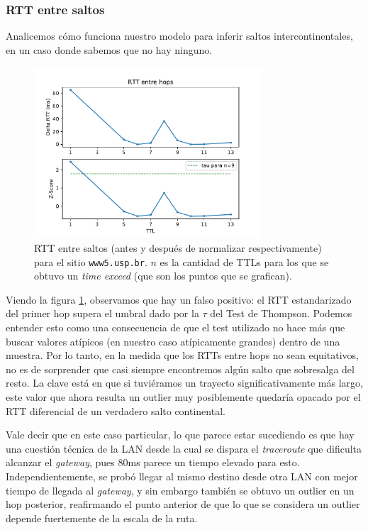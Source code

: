 \subsubsection*{RTT entre saltos}

Analicemos cómo funciona nuestro modelo para inferir saltos intercontinentales, en un caso donde sabemos que no hay ninguno.

\begin{figure}[H]
  \centering
  \includegraphics[width=8.5cm]{figs/traceroute-saopaulo.pdf}
  \caption{\footnotesize RTT entre saltos (antes y después de normalizar respectivamente) para el sitio \texttt{www5.usp.br}. $n$ es la cantidad de TTLs para los que se obtuvo un \emph{time exceed} (que son los puntos que se grafican).}
  \label{plot-saopaulo}
\end{figure}

Viendo la figura \ref{plot-saopaulo}, observamos que hay un falso positivo: el RTT estandarizado del primer hop supera el umbral dado por la $\tau$ del Test de Thompson. Podemos entender esto como una consecuencia de que el test utilizado no hace más que buscar valores atípicos (en nuestro caso atípicamente grandes) dentro de una muestra. Por lo tanto, en la medida que los RTTs entre hops no sean equitativos, no es de sorprender que casi siempre encontremos algún salto que sobresalga del resto. La clave está en que si tuviéramos un trayecto significativamente más largo, este valor que ahora resulta un outlier muy posiblemente quedaría opacado por el RTT diferencial de un verdadero salto continental.

Vale decir que en este caso particular, lo que parece estar sucediendo es que hay una cuestión técnica de la LAN desde la cual se dispara el \emph{traceroute} que dificulta alcanzar el \emph{gateway}, pues 80ms parece un tiempo elevado para esto. Independientemente, se probó llegar al mismo destino desde otra LAN con mejor tiempo de llegada al \emph{gateway}, y sin embargo también se obtuvo un outlier en un hop posterior, reafirmando el punto anterior de que lo que se considera un outlier depende fuertemente de la escala de la ruta. 

